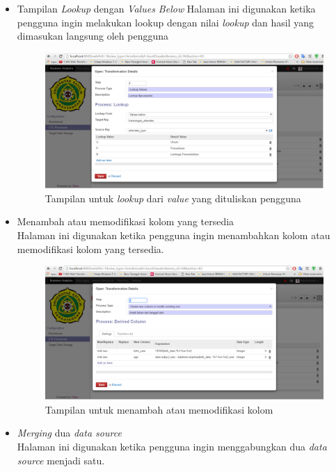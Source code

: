 \begin{itemize}
		\item Tampilan \textit{Lookup} dengan \textit{Values Below}
		Halaman ini digunakan ketika pengguna ingin melakukan lookup dengan nilai \textit{lookup} dan hasil yang dimasukan langsung oleh pengguna
		\begin{figure}[H]
		\centering
		\includegraphics[scale=0.4]{Gambar/tampilan-lookup-values-below}
		\caption{Tampilan untuk \textit{lookup} dari \textit{value} yang dituliskan pengguna}
		\end{figure}
		
		\item Menambah atau memodifikasi kolom yang tersedia\\
		Halaman ini digunakan ketika pengguna ingin menambahkan kolom atau memodifikasi kolom yang tersedia.
		
		\begin{figure}[H]
		\centering
		\includegraphics[scale=0.4]{Gambar/tampilan-menambah-kolom}
		\caption{Tampilan untuk menambah atau memodifikasi kolom}
		\end{figure}
		
		
		\item \textit{Merging} dua \textit{data source}\\
		Halaman ini digunakan ketika pengguna ingin menggabungkan dua \textit{data source} menjadi satu.
		

\end{itemize}
